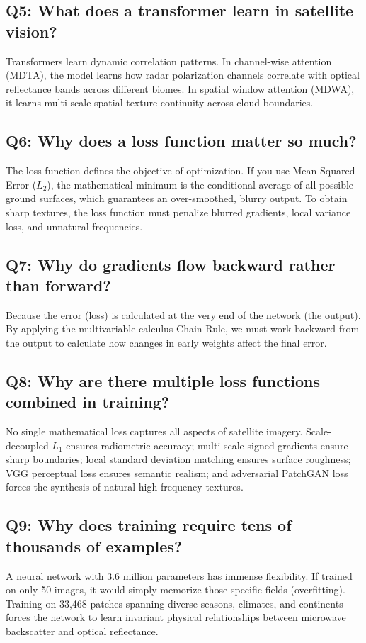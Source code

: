 \subsection*{Q5: What does a transformer learn in satellite vision?}
Transformers learn dynamic correlation patterns. In channel-wise attention (MDTA), the model learns how radar polarization channels correlate with optical reflectance bands across different biomes. In spatial window attention (MDWA), it learns multi-scale spatial texture continuity across cloud boundaries.

\subsection*{Q6: Why does a loss function matter so much?}
The loss function defines the objective of optimization. If you use Mean Squared Error ($L_2$), the mathematical minimum is the conditional average of all possible ground surfaces, which guarantees an over-smoothed, blurry output. To obtain sharp textures, the loss function must penalize blurred gradients, local variance loss, and unnatural frequencies.

\subsection*{Q7: Why do gradients flow backward rather than forward?}
Because the error (loss) is calculated at the very end of the network (the output). By applying the multivariable calculus Chain Rule, we must work backward from the output to calculate how changes in early weights affect the final error.

\subsection*{Q8: Why are there multiple loss functions combined in training?}
No single mathematical loss captures all aspects of satellite imagery. Scale-decoupled $L_1$ ensures radiometric accuracy; multi-scale signed gradients ensure sharp boundaries; local standard deviation matching ensures surface roughness; VGG perceptual loss ensures semantic realism; and adversarial PatchGAN loss forces the synthesis of natural high-frequency textures.

\subsection*{Q9: Why does training require tens of thousands of examples?}
A neural network with 3.6 million parameters has immense flexibility. If trained on only 50 images, it would simply memorize those specific fields (overfitting). Training on 33,468 patches spanning diverse seasons, climates, and continents forces the network to learn invariant physical relationships between microwave backscatter and optical reflectance.

